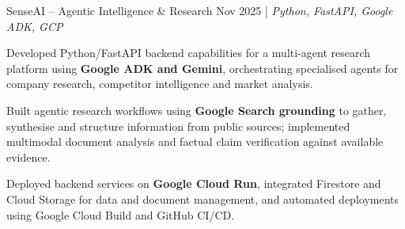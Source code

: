 \resumeSubheadings
{SenseAI -- Agentic Intelligence \& Research }
{Nov 2025}
{}{}{| \textit{Python, FastAPI, Google ADK, GCP}}

\resumeItemListStart
{}
{Developed Python/FastAPI backend capabilities for a multi-agent research platform using \textbf{Google ADK and Gemini}, orchestrating specialised agents for company research, competitor intelligence and market analysis.}

{Built agentic research workflows using \textbf{Google Search grounding} to gather, synthesise and structure information from public sources; implemented multimodal document analysis and factual claim verification against available evidence.}

{Deployed backend services on \textbf{Google Cloud Run}, integrated Firestore and Cloud Storage for data and document management, and automated deployments using Google Cloud Build and GitHub CI/CD.}
\resumeItemListEnd